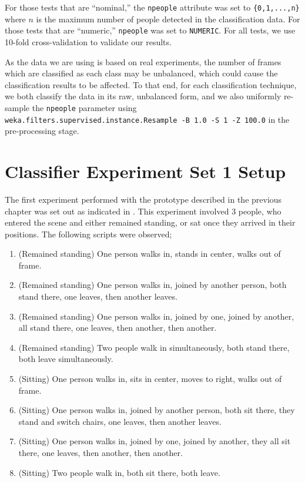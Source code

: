 \documentclass[../thesis/thesis.tex]{subfiles}
\begin{document}
For those tests that are ``nominal,'' the \texttt{npeople} attribute was set to \texttt{\{0,1,...,n\}} where $n$ is the maximum number of people detected in the classification data. For those tests that are ``numeric,'' \texttt{npeople} was set to \texttt{NUMERIC}. For all tests, we use 10-fold cross-validation to validate our results.

As the data we are using is based on real experiments, the number of frames which are classified as each class may be unbalanced, which could cause the classification results to be affected. To that end, for each classification technique, we both classify the data in its raw, unbalanced form, and we also uniformly re-sample the \texttt{npeople} parameter using \texttt{weka.filters.supervised.instance.Resample -B 1.0 -S 1 -Z 100.0} in the pre-processing stage.


\section{Classifier Experiment Set 1 Setup}
The first experiment performed with the prototype described in the previous chapter was set out as indicated in . This experiment involved 3 people, who entered the scene and either remained standing, or sat once they arrived in their positions. The following scripts were observed;

\begin{enumerate}
\item (Remained standing) One person walks in, stands in center, walks out of frame.
\item (Remained standing) One person walks in, joined by another person, both stand there, one leaves, then another leaves.
\item (Remained standing) One person walks in, joined by one, joined by another, all stand there, one leaves, then another, then another.
\item (Remained standing) Two people walk in simultaneously, both stand there, both leave simultaneously.
\item (Sitting) One person walks in, sits in center, moves to right, walks out of frame.
\item (Sitting) One person walks in, joined by another person, both sit there, they stand and switch chairs, one leaves, then another leaves.
\item (Sitting) One person walks in, joined by one, joined by another, they all sit there, one leaves, then another, then another.
\item (Sitting) Two people walk in, both sit there, both leave.
\end{enumerate}
\end{document}
